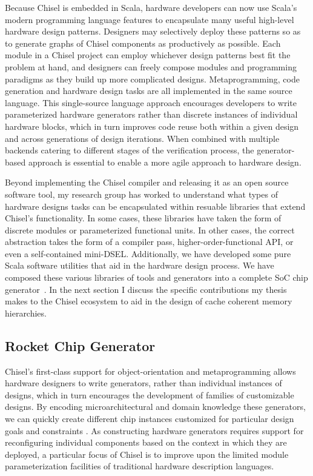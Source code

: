 Because Chisel is embedded in Scala, hardware developers can now use Scala's modern programming language features to encapsulate many useful high-level hardware design patterns.
Designers may selectively deploy these patterns so as to generate graphs of Chisel components as productively as possible.
Each module in a Chisel project can employ whichever design patterns best fit the problem at hand, and designers can freely compose modules and programming paradigms as they build up more complicated designs.
Metaprogramming, code generation and hardware design tasks are all implemented in the same source language.
This single-source language approach encourages developers to write parameterized hardware generators rather than discrete instances of individual hardware blocks,
which in turn improves code reuse both within a given design and across generations of design iterations.
When combined with multiple backends catering to different stages of the verification process, the generator-based approach is essential to enable a more agile approach to hardware design.

Beyond implementing the Chisel compiler and releasing it as an open source software tool, my research group has worked to understand what types of hardware designs tasks can be encapsulated within resuable libraries that extend Chisel's functionality.
In some cases, these libraries have taken the form of discrete modules or parameterized functional units.
In other cases, the correct abstraction takes the form of a compiler pass, higher-order-functional API, or even a self-contained mini-DSEL.
Additionally, we have developed some pure Scala software utilities that aid in the hardware design process.
We have composed these various libraries of tools and generators into a complete SoC chip generator~\cite{rocket}.
In the next section I discuss the specific contributions my thesis makes to the Chisel ecosystem to aid in the design of cache coherent memory hierarchies.

\subsection{Rocket Chip Generator}

Chisel's first-class support for object-orientation and
metaprogramming allows hardware designers to write generators,
rather than individual instances of designs, which in turn encourages
the development of families of customizable designs.  By encoding
microarchitectural and domain knowledge
these generators, we can quickly create different
chip instances customized for particular design goals and constraints
\cite{shacham-micro10}.  As constructing hardware generators requires
support for reconfiguring individual components based on the context
in which they are deployed, a particular focus of Chisel is to improve
upon the limited module parameterization facilities of traditional
hardware description languages.

